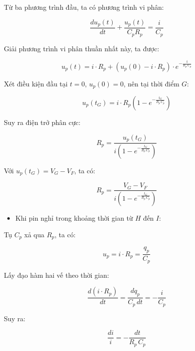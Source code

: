 \documentclass{thesis}
\begin{document}
Từ ba phương trình đầu, ta có phương trình vi phân:

\begin{equation}
\frac{du_p(t)}{dt} + \frac{u_p(t)}{C_p R_p} = \frac{i}{C_p}
\end{equation}

Giải phương trình vi phân thuần nhất này, ta được:

\begin{equation}
u_p(t) = i \cdot R_p + \left( u_p(0) - i \cdot R_p \right) \cdot e^{-\frac{t}{R_p\, C_p}}
\end{equation}

Xét điều kiện đầu tại \( t = 0 \), \( u_p(0) = 0 \), nên tại thời điểm \( G \):

\begin{equation}
u_p(t_G) = i \cdot R_p \left( 1 - e^{-\frac{t_G}{R_p\, C_p}} \right)
\end{equation}

Suy ra điện trở phân cực:

\begin{equation}
R_p = \frac{u_p(t_G)}{i \left( 1 - e^{-\frac{t_G}{R_p\, C_p}} \right)}
\end{equation}

Với \( u_p(t_G) = V_G - V_F \), ta có:

\begin{equation}
R_p = \frac{V_G - V_F}{i \left( 1 - e^{-\frac{t_G}{R_p\, C_p}} \right)}
\end{equation}

\begin{itemize}
    \item Khi pin nghỉ trong khoảng thời gian từ \( H \) đến \( I \):
\end{itemize}

Tụ \( C_p \) xả qua \( R_p \), ta có:

\begin{equation}
u_p = i \cdot R_p = \frac{q_p}{C_p}
\end{equation}

Lấy đạo hàm hai vế theo thời gian:

\begin{equation}
\frac{d(i \cdot R_p)}{dt} = \frac{dq_p}{C_p\, dt} = -\frac{i}{C_p}
\end{equation}

Suy ra:

\begin{equation}
\frac{di}{i} = -\frac{dt}{R_p\, C_p}
\end{equation}
\end{document}
